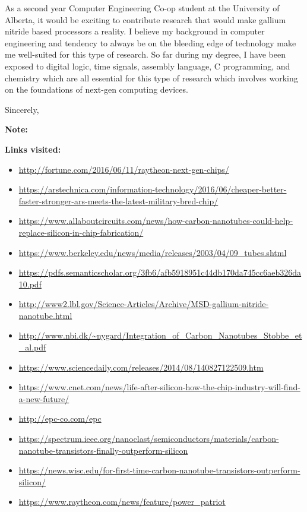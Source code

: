 \documentclass[letterpaper]{letter}
\begin{document}
\begin{letter}
As a second year Computer Engineering Co-op student at the University of
Alberta, it would be exciting to contribute research that would make gallium
nitride based processors a reality. I believe my background in computer
engineering and tendency to always be on the bleeding edge of technology make me
well-suited for this type of research. So far during my degree, I have been
exposed to digital logic, time signals, assembly language, C programming, and
chemistry which are all essential for this type of research which involves
working on the foundations of next-gen computing devices.

\closing{Sincerely,}

\end{letter}
\newpage
\textbf{Note:}

\textbf{Links visited:}
\begin{itemize}
  \item \url{http://fortune.com/2016/06/11/raytheon-next-gen-chips/}
  \item \url{https://arstechnica.com/information-technology/2016/06/cheaper-better-faster-stronger-ars-meets-the-latest-military-bred-chip/}
  \item \url{https://www.allaboutcircuits.com/news/how-carbon-nanotubes-could-help-replace-silicon-in-chip-fabrication/}
  \item \url{https://www.berkeley.edu/news/media/releases/2003/04/09_tubes.shtml}
  \item \url{https://pdfs.semanticscholar.org/3fb6/afb5918951c44db170da745cc6aeb326da10.pdf}
  \item \url{http://www2.lbl.gov/Science-Articles/Archive/MSD-gallium-nitride-nanotube.html}
  \item \url{http://www.nbi.dk/~nygard/Integration_of_Carbon_Nanotubes_Stobbe_et_al.pdf}
  \item \url{https://www.sciencedaily.com/releases/2014/08/140827122509.htm}
  \item \url{https://www.cnet.com/news/life-after-silicon-how-the-chip-industry-will-find-a-new-future/}
  \item \url{http://epc-co.com/epc}
  \item \url{https://spectrum.ieee.org/nanoclast/semiconductors/materials/carbon-nanotube-transistors-finally-outperform-silicon}
  \item \url{https://news.wisc.edu/for-first-time-carbon-nanotube-transistors-outperform-silicon/}
  \item \url{https://www.raytheon.com/news/feature/power_patriot}

\end{itemize}
\end{document}

